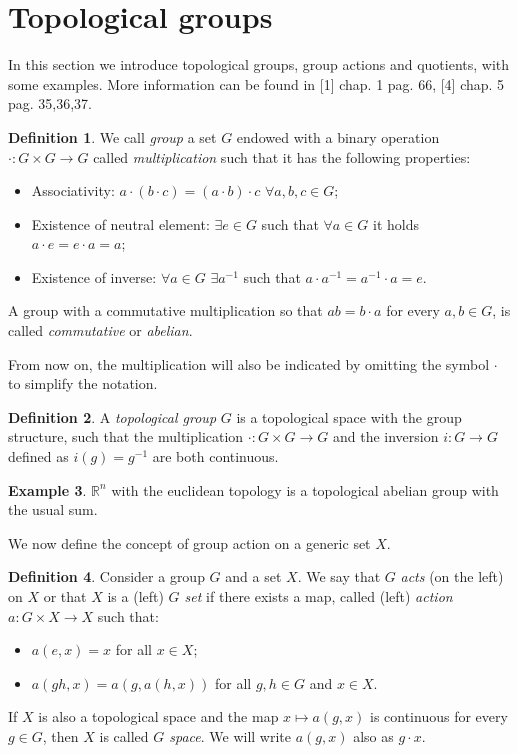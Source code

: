 \documentclass[12pt,a4paper]{report}
\theoremstyle{definition}
\newtheorem{Def}{Definition}[chapter]
\theoremstyle{Theorem}
\theoremstyle{definition}
\newtheorem{Ex}[Def]{Example}
\theoremstyle{definition}
\begin{document}
	\section{Topological groups}
	In this section we introduce topological groups, group actions and quotients, with some examples. More information can be found in [1] chap. 1 pag. 66, [4] chap. 5 pag. 35,36,37. 
	\begin{Def}
		We call \textit{group} a set $G$ endowed with a binary operation $\cdot:G\times G\rightarrow G$ called \textit{multiplication} such that it has the following properties:
		\begin{itemize}
			\item Associativity: $a\cdot (b\cdot c)=(a\cdot b)\cdot c$ $\forall a,b,c\in G$;
			\item Existence of neutral element: $\exists e\in G$ such that $\forall a\in G$ it holds $a\cdot e=e\cdot a=a$;
			\item Existence of inverse: $\forall a\in G$ $\exists a^{-1}$ such that $a\cdot a^{-1}=a^{-1}\cdot a=e$.
		\end{itemize}
		A group with a commutative multiplication so that $ab= b\cdot a$ for every $a,b\in G$, is called \textit{commutative} or \textit{abelian}.
	\end{Def}
	From now on, the multiplication will also be indicated by omitting the symbol $\cdot$ to simplify the notation.
	\begin{Def}
		A \textit{topological group} $G$ is a topological space with the group structure, such that the multiplication $\cdot:G\times G\rightarrow G$ and the inversion $i:G\rightarrow G$ defined as $i(g)=g^{-1}$ are both continuous.
	\end{Def}
	\begin{Ex}
		$\mathbb{R}^n$ with the euclidean topology is a topological abelian group with the usual sum.
	\end{Ex}
	We now define the concept of group action on a generic set $X$.
	\begin{Def}
		Consider a group $G$ and a set $X$. We say that $G$ \textit{acts} (on the left) on $X$ or that $X$ is a (left) \textit{$G$ set} if there exists a map, called (left) \textit{action} $a:G\times X\rightarrow X$ such that:
		\begin{itemize}
			\item 	$a(e,x)=x$ for all $x\in X$;
			\item $a(gh,x)=a(g,a(h,x))$ for all $g,h\in G$ and $x\in X$.
		\end{itemize} 
		If $X$ is also a topological space and the map $x\longmapsto a(g,x)$ is continuous for every $g\in G$, then $X$ is called \textit{$G$ space}.
		We will write $a(g,x)$ also as $g\cdot x$.
	\end{Def}
\end{document}
